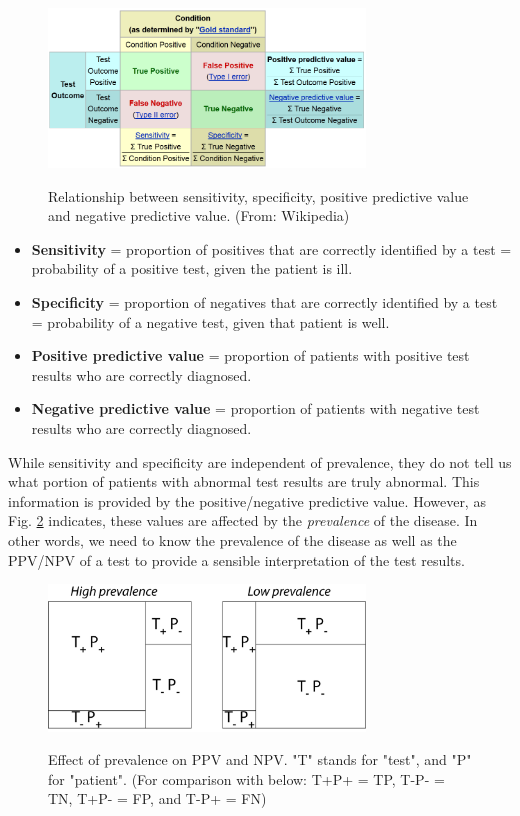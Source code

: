 \begin{figure}[ht]
  \centering
  \includegraphics[width=0.75\textwidth]{../Images/Sensitivity_Specificity_Diagram.png}\\
  \caption{Relationship between sensitivity, specificity, positive predictive value and negative predictive value. (From: Wikipedia)}\label{fig:sens_spec_diagram}
\end{figure}

\begin{itemize}
  \item \textbf{Sensitivity} = proportion of positives that are correctly identified by a test = probability of a positive test, given the patient is ill.
  \item \textbf{Specificity} = proportion of negatives that are correctly identified by a test = probability of a negative test, given that patient is well.
  \item \textbf{Positive predictive value} = proportion of patients with positive test results who are correctly diagnosed.
  \item \textbf{Negative predictive value} = proportion of patients with negative test results who are correctly diagnosed.
\end{itemize}

While sensitivity and specificity are independent of prevalence, they do not tell us what portion of patients with abnormal test results are truly abnormal. This information is provided by the positive/negative predictive value. However, as Fig. \ref{fig:prevalence} indicates, these values are affected by the \emph{prevalence}  of the disease. In other words, we need to know the prevalence of the disease as well as the PPV/NPV of a test to provide a sensible interpretation of the test results.

\begin{figure}[ht]
  \centering
  \includegraphics[width=0.75\textwidth]{../Images/Sensitivity_Specificity.png}\\
  \caption{Effect of prevalence on PPV and NPV. "T" stands for "test", and "P" for "patient". (For comparison with below: T+P+ = TP, T-P- = TN, T+P- = FP, and T-P+ = FN)} \label{fig:prevalence}
\end{figure}

